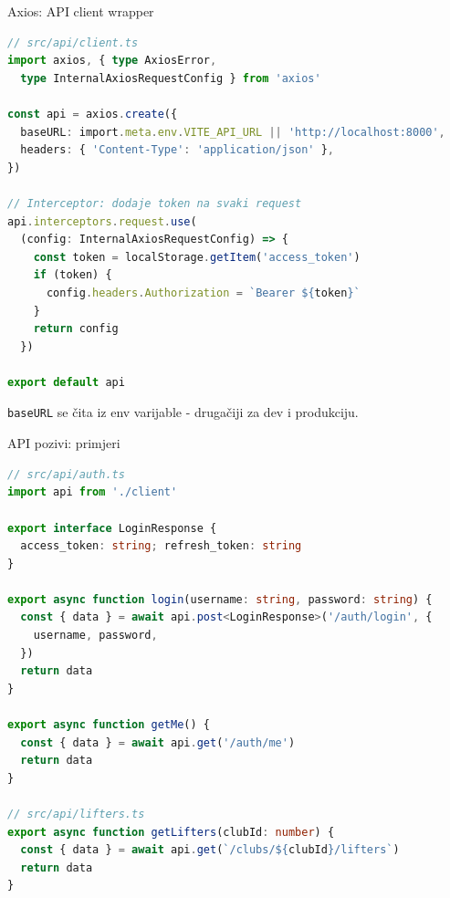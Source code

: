 \begin{frame}[fragile,shrink=5]{Axios: API client wrapper}
\begin{lstlisting}[language=typescript]
// src/api/client.ts
import axios, { type AxiosError,
  type InternalAxiosRequestConfig } from 'axios'

const api = axios.create({
  baseURL: import.meta.env.VITE_API_URL || 'http://localhost:8000',
  headers: { 'Content-Type': 'application/json' },
})

// Interceptor: dodaje token na svaki request
api.interceptors.request.use(
  (config: InternalAxiosRequestConfig) => {
    const token = localStorage.getItem('access_token')
    if (token) {
      config.headers.Authorization = `Bearer ${token}`
    }
    return config
  })

export default api
\end{lstlisting}

\vspace{0.4em}
\texttt{baseURL} se čita iz env varijable - drugačiji za dev i produkciju.
\end{frame}

\begin{frame}[fragile,shrink=5]{API pozivi: primjeri}
\begin{lstlisting}[language=typescript]
// src/api/auth.ts
import api from './client'

export interface LoginResponse {
  access_token: string; refresh_token: string
}

export async function login(username: string, password: string) {
  const { data } = await api.post<LoginResponse>('/auth/login', {
    username, password,
  })
  return data
}

export async function getMe() {
  const { data } = await api.get('/auth/me')
  return data
}

// src/api/lifters.ts
export async function getLifters(clubId: number) {
  const { data } = await api.get(`/clubs/${clubId}/lifters`)
  return data
}
\end{lstlisting}
\end{frame}

